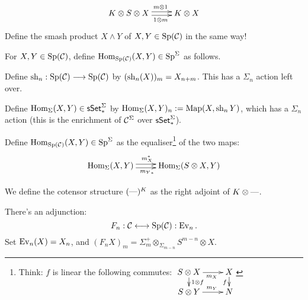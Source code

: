 \documentclass[11pt]{article}
\begin{document}
\begin{MichaelStableModelCats}
\begin{itemise}
\[\xymatrix{
K\otimes S\otimes X\ar@<.5ex>[r]^{\ \ m\otimes 1}\ar@<-.5ex>[r]_{\ \ 1\otimes m}&K\otimes X
}\]
Define the smash product $X\wedge Y$ of $X,Y\in\operatorname{Sp}(\mathcal{C})$ in the same way!
\item For $X,Y\in\operatorname{Sp}(\mathcal{C})$, define $\operatorname{Hom}_{\operatorname{Sp}(\mathcal{C})}(X,Y)\in \operatorname{Sp}^\Sigma$ as follows.
\begin{itemise}
\item Define $\operatorname{sh}_n:\operatorname{Sp}(\mathcal{C})\longrightarrow\operatorname{Sp}(\mathcal{C})$ by $(\operatorname{sh}_n(X))_m=X_{n+m}$. This has a $\Sigma_n$ action left over.
\item Define $\operatorname{Hom}_\Sigma(X,Y)\in\operatorname{{\mathsf{sSet}}}_*^\Sigma$ by $\operatorname{Hom}_\Sigma(X,Y)_n:=\operatorname{Map}(X,\operatorname{sh}_nY)$, which has a $\Sigma_n$ action (this is the enrichment of $\mathcal{C}^\Sigma$ over $\operatorname{{\mathsf{sSet}}}_*^\Sigma$).
\item Define $\operatorname{Hom}_{\operatorname{Sp}(\mathcal{C})}(X,Y)\in\operatorname{Sp}^\Sigma$ as the equaliser\footnote{Think: $f$ is linear \Iff the following commutes: $\xymatrix@R=1em{
\ar[d]^{1\otimes f}S\otimes X\ar[r]_{\ \ m_X}&X\ar[d]_f\\
S\otimes Y\ar[r]^{\ \ m_Y}&N
}$} of the two maps:
\[\xymatrix{
\Hom_\Sigma(X,Y)\ar@<.5ex>[r]^{m^*_X\ \ }\ar@<-.5ex>[r]_{{m_Y}_*\ \ }&\Hom_\Sigma(S\otimes X,Y)
}\]
\end{itemise}
\item We define the cotensor structure $(\textup{---})^K$ as the right adjoint of $K\otimes\textup{---}$.
\item There's an adjunction:
\[F_n:\mathcal{C}\longleftrightarrow\operatorname{Sp}(\mathcal{C}):\operatorname{Ev}_n.\]
Set $\operatorname{Ev}_n(X)=X_n$, and $(F_nX)_m=\Sigma_m^+\otimes_{\Sigma_{m-n}}S^{m-n}\otimes X$. 
\end{itemise}

\end{MichaelStableModelCats}
\end{document}
